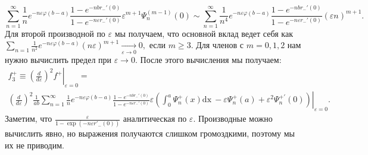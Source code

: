 \documentclass{article}
\newcommand{\dx}{\mathrm{dx}~}
\begin{document}
\begin{equation}
  \label{eq:70}
  \sum_{n=1}^{\infty} \frac{1}{n} e^{-n\varepsilon\varphi(b-a)}
  \frac{1-e^{-nbr_{-}'(0)}}{1-e^{-n\varepsilon r_{-}'(0)}} \varepsilon^{m+1}\Psi_{n}^{(m-1)}(0)\sim
  \sum_{n=1}^{\infty} \frac{1}{n^{4}} e^{-n\varepsilon\varphi(b-a)}
  \frac{1-e^{-nbr_{-}'(0)}}{1-e^{-n\varepsilon r_{-}'(0)}} (\varepsilon n )^{m+1}.
\end{equation}
Для второй производной по  $\varepsilon$ мы получаем, что основной вклад ведет себя как
$\sum_{n=1}\frac{1}{n^{2}}e^{-n\varepsilon\varphi(b-a)}
  (n\varepsilon)^{m+1}\xrightarrow[\varepsilon\to 0]{}0,$
если $m\geq 3$. Для членов с  $m=0,1,2$ нам нужно вычислить предел при $\varepsilon\to 0$. После
этого вычисления мы получаем:
\begin{multline}
  \label{eq:71}
  f^{+}_{3}\equiv\left.\left(\frac{d}{d\varepsilon}\right)^{2} f^{+}\right|_{\varepsilon=0} =\\
  \left.\left(\frac{d}{d\varepsilon}\right)^{2}\frac{1}{ab}\sum_{n=1}^{\infty} \frac{1}{n}
  e^{-n\varepsilon\varphi(b-a)} \frac{1-e^{-nbr_{-}'(0)}}{1-e^{-n\varepsilon r_{-}'(0)}}
  \varepsilon\left(\int_{0}^{a} \Psi_{n}^{+}(x) \dx -\varepsilon \Psi_{n}^{+}(a) +\varepsilon^{2}\Psi^{+'}_{n}(0)\right)\right|_{\varepsilon=0}.
\end{multline}
Заметим, что  $\frac{\varepsilon}{1-\exp(-n\varepsilon r'_{-}(0))}$ аналитическая по $\varepsilon$.
Производные можно вычислить явно, но выражения получаются слишком громоздкими, поэтому мы их не приводим.
\end{document}
